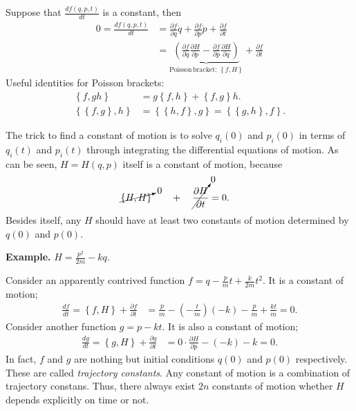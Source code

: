 Suppose that $\frac{df(q,p,t)}{dt}$ is a constant, then
\begin{align}
0=\frac{df(q,p,t)}{dt} & =\frac{\partial f}{\partial q}\dot{q}+\frac{\partial f}{\partial p}\dot{p}+\frac{\partial f}{\partial t}\\
 & =\underbrace{\left(\frac{\partial f}{\partial q}\frac{\partial H}{\partial p}-\frac{\partial f}{\partial p}\frac{\partial H}{\partial q}\right)}_{\mathrm{Poisson \,bracket:\,}\left\{ f,H\right\} }+\frac{\partial f}{\partial t}
\end{align}
Useful identities for Poisson brackets:
\begin{align}
\left\{ f,gh\right\}  & =g\left\{ f,h\right\} +\left\{ f,g\right\} h.\\
\left\{ \left\{ f,g\right\} ,h\right\}  & =\left\{ \left\{ h,f\right\} ,g\right\} =\left\{ \left\{ g,h\right\} ,f\right\} .
\end{align}

The trick to find a constant of motion is to solve $ q_i(0) $ and $ p_i(0) $ in terms of $ q_i(t) $ and $ p_i(t) $ through integrating the differential equations of motion. As can be seen, $ H=H(q,p) $ itself is a constant of motion, because
\begin{align}
\cancelto{0}{ \{ H,H \} } \qquad +\quad  \cancelto{0}{ \frac{\partial {H}}{\partial t} } &=0.
\end{align}
Besides itself, any $ H $ should have at least two constants of motion determined by $ q(0) $ and $ p(0) $.

\textbf{Example. }$H=\frac{p^{2}}{2m}-kq$.

Consider an apparently contrived function $f=q-\frac{p}{m}t+\frac{k}{2m}t^{2}$.
It is a constant of motion;
\begin{align}
\frac{df}{dt}=\left\{ f,H\right\} +\frac{\partial f}{\partial t} & =\frac{p}{m}-\left(-\frac{t}{m}\right)\left(-k\right)-\frac{p}{m}+\frac{kt}{m}=0.
\end{align}
Consider another function $g=p-kt$. It is also a constant of motion;
\begin{align}
\frac{dg}{dt}=\left\{ g,H\right\} +\frac{\partial g}{\partial t} & =0\cdot\frac{\partial H}{\partial p}-(-k)-k=0.
\end{align}
In fact, $f$ and $g$ are nothing but initial conditions $q(0)$
and $p(0)$ respectively. These are called \emph{trajectory constants}.
Any constant of motion is a combination of trajectory constans. Thus,
there always exist $2n$ constants of motion whether $H$ depends
explicitly on time or not.

